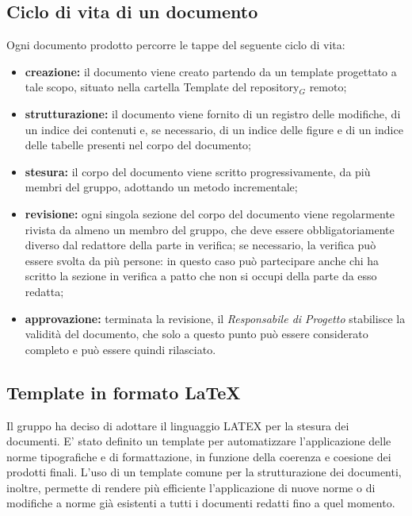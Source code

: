 \subsection{Ciclo di vita di un documento}\label{ProcessiDiSupportoDocumentazioneCicloDiVitaDiUnDocumento}
Ogni documento prodotto percorre le tappe del seguente ciclo di vita:
\begin{itemize}
\item \textbf{creazione:} il documento viene creato partendo da un template progettato a tale
	scopo, situato nella cartella Template del repository$_G$ remoto;
	\item \textbf{strutturazione:} il documento viene fornito di un registro delle modifiche, di un indice dei   contenuti e, se necessario, di un indice delle figure e di un indice delle tabelle presenti nel corpo del documento;
		\item \textbf{stesura:} il corpo del documento viene scritto progressivamente, da più membri del gruppo, adottando un metodo incrementale;
			\item \textbf{revisione:} ogni singola sezione del corpo del documento viene regolarmente rivista da almeno un membro del gruppo, che deve essere obbligatoriamente diverso dal redattore della parte in verifica; se necessario, la verifica può essere svolta da più persone: in questo caso può partecipare anche chi ha scritto la sezione in verifica a patto che non si occupi della parte da esso redatta;
				\item \textbf{approvazione:} terminata la revisione, il \textit{Responsabile di Progetto} stabilisce la validità del documento, che solo a questo punto può essere considerato completo e può essere quindi rilasciato.
\end{itemize}
\subsection{Template in formato \LaTeX}\label{ProcessiDiSupportoDocumentazioneTemplateInFormatoLatex}
Il gruppo ha deciso di adottare il linguaggio LATEX per la stesura dei documenti. E' stato definito un template per automatizzare l’applicazione delle norme tipografiche e di formattazione, in funzione della coerenza e coesione dei prodotti finali.
L’uso di un template comune per la strutturazione dei documenti, inoltre, permette di rendere più efficiente l’applicazione di nuove norme o di modifiche a norme già esistenti a tutti i documenti redatti fino a quel momento.
